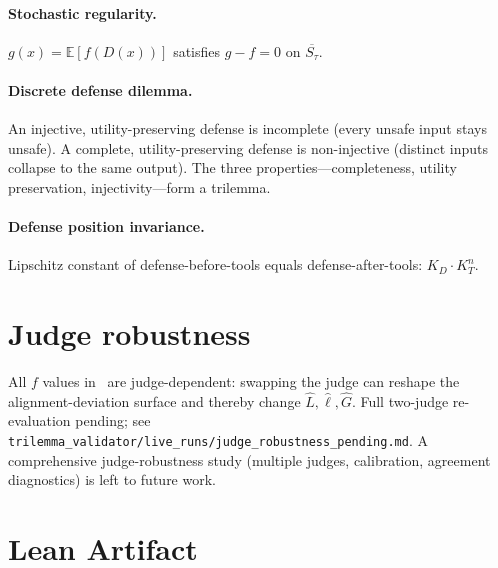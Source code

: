 \documentclass{article}
\newcommand{\cl}[1]{\overline{#1}}
\begin{document}
\paragraph{Stochastic regularity.}
$g(x) = \mathbb{E}[f(D(x))]$ satisfies $g - f = 0$ on $\cl{S_\tau}$.

\paragraph{Discrete defense dilemma.}
An injective, utility-preserving defense is incomplete (every unsafe
input stays unsafe). A complete, utility-preserving defense is
non-injective (distinct inputs collapse to the same output).
The three properties---completeness, utility preservation,
injectivity---form a trilemma.

\paragraph{Defense position invariance.}
Lipschitz constant of defense-before-tools equals defense-after-tools:
$K_D \cdot K_T^n$.


\section{Judge robustness}
\label{app:judge-robustness}

All $f$ values in~ are judge-dependent:
swapping the judge can reshape the alignment-deviation surface and
thereby change $\hat L, \hat\ell, \hat G$. Full two-judge
re-evaluation pending; see
\texttt{trilemma\_validator/live\_runs/judge\_robustness\_pending.md}.
A comprehensive judge-robustness study (multiple judges,
calibration, agreement diagnostics) is left to future work.


\section{Lean Artifact}
\label{app:artifact}
\end{document}

